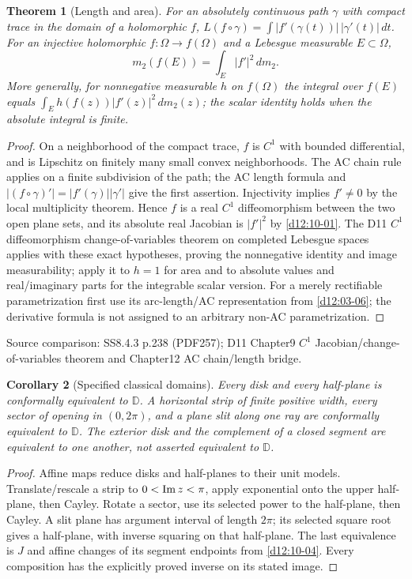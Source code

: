 \documentclass[11pt,a4paper,openany]{book}
\newtheorem{theorem}{Theorem}[chapter]
\newtheorem{corollary}[theorem]{Corollary}
\theoremstyle{definition}
\theoremstyle{remark}\newtheorem{remark}[theorem]{Remark}
\newcommand{\D}{\mathbb D}\newcommand{\Chat}{\widehat{\mathbb C}}
\newcommand{\dd}{\,d}\newcommand{\iu}{\mathrm i}
\newcommand{\family}[1]{}
\newcommand{\source}[1]{\par\begingroup\small\sffamily\color{black!65}Source comparison: #1\par\endgroup}
\begin{document}
\begin{theorem}[Length and area]\family{D12.10.05}\label{d12:10-05}
For an absolutely continuous path $\gamma$ with compact trace in the domain of a holomorphic $f$,
$L(f\circ\gamma)=\int |f'(\gamma(t))|\,|\gamma'(t)|\,dt$.
For an injective holomorphic $f:\Omega\to f(\Omega)$ and a Lebesgue measurable $E\subset\Omega$,
\[
 m_2(f(E))=\int_E |f'|^2\dd m_2.
\]
More generally, for nonnegative measurable $h$ on $f(\Omega)$ the integral over $f(E)$ equals $\int_E h(f(z))|f'(z)|^2\dd m_2(z)$; the scalar identity holds when the absolute integral is finite.
\end{theorem}
\begin{proof}
On a neighborhood of the compact trace, $f$ is $C^1$ with bounded differential, and is Lipschitz on finitely many small convex neighborhoods. The AC chain rule applies on a finite subdivision of the path; the AC length formula and $|(f\circ\gamma)'|=|f'(\gamma)||\gamma'|$ give the first assertion. Injectivity implies $f'\ne0$ by the local multiplicity theorem. Hence $f$ is a real $C^1$ diffeomorphism between the two open plane sets, and its absolute real Jacobian is $|f'|^2$ by \cref{d12:10-01}. The D11 $C^1$ diffeomorphism change-of-variables theorem on completed Lebesgue spaces applies with these exact hypotheses, proving the nonnegative identity and image measurability; apply it to $h=1$ for area and to absolute values and real/imaginary parts for the integrable scalar version. For a merely rectifiable parametrization first use its arc-length/AC representation from \cref{d12:03-06}; the derivative formula is not assigned to an arbitrary non-AC parametrization.
\end{proof}
\source{SS8.4.3 p.238 (PDF257); D11 Chapter9 $C^1$ Jacobian/change-of-variables theorem and Chapter12 AC chain/length bridge.}

\begin{corollary}[Specified classical domains]\family{D12.10.06}\label{d12:10-06}
Every disk and every half-plane is conformally equivalent to $\D$. A horizontal strip of finite positive width, every sector of opening in $(0,2\pi)$, and a plane slit along one ray are conformally equivalent to $\D$. The exterior disk and the complement of a closed segment are equivalent to one another, not asserted equivalent to $\D$.
\end{corollary}
\begin{proof}
Affine maps reduce disks and half-planes to their unit models. Translate/rescale a strip to $0<\operatorname{Im} z<\pi$, apply exponential onto the upper half-plane, then Cayley. Rotate a sector, use its selected power to the half-plane, then Cayley. A slit plane has argument interval of length $2\pi$; its selected square root gives a half-plane, with inverse squaring on that half-plane. The last equivalence is $J$ and affine changes of its segment endpoints from \cref{d12:10-04}. Every composition has the explicitly proved inverse on its stated image.
\end{proof}
\end{document}
